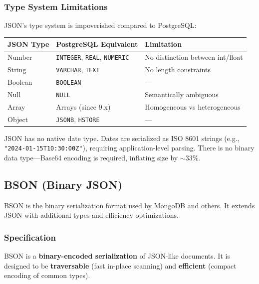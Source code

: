 \documentclass[12pt,a4paper]{article}
\begin{document}
\subsubsection{Type System Limitations}

JSON's type system is impoverished compared to PostgreSQL:

\begin{center}
\begin{tabular}{@{}lll@{}}
\toprule
\textbf{JSON Type} & \textbf{PostgreSQL Equivalent} & \textbf{Limitation} \\
\midrule
Number & \texttt{INTEGER}, \texttt{REAL}, \texttt{NUMERIC} & No distinction between int/float \\
String & \texttt{VARCHAR}, \texttt{TEXT} & No length constraints \\
Boolean & \texttt{BOOLEAN} & --- \\
Null & \texttt{NULL} & Semantically ambiguous \\
Array & Arrays (since 9.x) & Homogeneous vs heterogeneous \\
Object & \texttt{JSONB}, \texttt{HSTORE} & --- \\
\bottomrule
\end{tabular}
\end{center}

\begin{rdbmsnote}
JSON has no native date type. Dates are serialized as ISO 8601 strings (e.g., \texttt{"2024-01-15T10:30:00Z"}), requiring application-level parsing. There is no binary data type---Base64 encoding is required, inflating size by $\sim$33\%.
\end{rdbmsnote}

\subsection{BSON (Binary JSON)}

BSON is the binary serialization format used by MongoDB and others. It extends JSON with additional types and efficiency optimizations.

\subsubsection{Specification}

\begin{definition}
BSON is a \textbf{binary-encoded serialization} of JSON-like documents. It is designed to be \textbf{traversable} (fast in-place scanning) and \textbf{efficient} (compact encoding of common types).
\end{definition}
\end{document}
